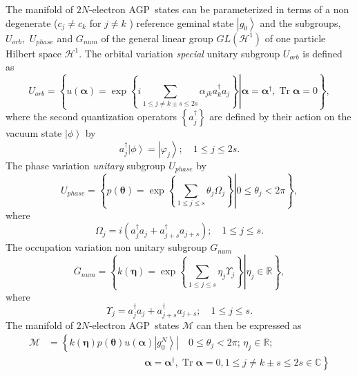 \documentclass[aps,preprint]{revtex4}%
\begin{document}
The manifold of $2N$-electron AGP\ states can be parameterized in terms of a
non degenerate ($c_{j}\neq c_{k}$ for $j\neq k$ ) reference geminal state
$\left\vert g_{0}\right\rangle $ and the subgroups, $U_{orb},$ $U_{phase}$ and
$G_{num}$ of the general linear group $GL\left(  \mathcal{H}^{1}\right)  $ of
one particle Hilbert space $\mathcal{H}^{1}$. The orbital variation
\emph{special} unitary subgroup $U_{orb}$ is defined as
\begin{equation}
U_{orb}=\left\{  \left.  u\left(  \mathbf{\alpha}\right)  =\exp\left\{
i\sum_{1\leq j\neq k\pm s\leq2s}\alpha_{jk}a_{k}^{\dagger}a_{j}\right\}
\right\vert \mathbf{\alpha}=\mathbf{\alpha}^{\dagger},\operatorname{Tr}%
\mathbf{\alpha}=0\right\}  ,\label{orb}%
\end{equation}
where the second quantization operators $\left\{  a_{j}^{\dagger}\right\}  $
are defined by their action on the vacuum state $\left\vert \phi\right\rangle
$ by
\begin{equation}
a_{j}^{\dagger}\left\vert \phi\right\rangle =\left\vert \varphi_{j}%
\right\rangle ;\quad1\leq j\leq2s.
\end{equation}
The phase variation \emph{unitary} subgroup $U_{phase}$ by%
\begin{equation}
U_{phase}=\left\{  \left.  p\left(  \mathbf{\theta}\right)  =\exp\left\{
\sum_{1\leq j\leq s}\theta_{j}\Omega_{j}\right\}  \right\vert 0\leq\theta
_{j}<2\pi\right\}  ,\label{phase}%
\end{equation}
where
\begin{equation}
\Omega_{j}=i\left(  a_{j}^{\dagger}a_{j}+a_{j+s}^{\dagger}a_{j+s}\right)
;\quad1\leq j\leq s.
\end{equation}
The occupation variation non unitary subgroup $G_{num}$
\begin{equation}
G_{num}=\left\{  \left.  k\left(  \mathbf{\eta}\right)  =\exp\left\{
\sum_{1\leq j\leq s}\eta_{j}\Upsilon_{j}\right\}  \right\vert \eta_{j}%
\in\mathbb{R}\right\}  ,\label{occup}%
\end{equation}
where
\begin{equation}
\Upsilon_{j}=a_{j}^{\dagger}a_{j}+a_{j+s}^{\dagger}a_{j+s};\quad1\leq j\leq s.
\end{equation}
The manifold of $2N$-electron AGP\ states $\mathcal{M}$ can then be expressed
as
\begin{align}
\mathcal{M}  & \mathcal{=}\left\{  \left.  k\left(  \mathbf{\eta}\right)
p\left(  \mathbf{\theta}\right)  u\left(  \mathbf{\alpha}\right)  \left\vert
g_{0}^{N}\right\rangle \right\vert \quad0\leq\theta_{j}<2\pi;\,\eta_{j}%
\in\mathbb{R};\right.  \nonumber\\
& \qquad\qquad\qquad\qquad\qquad\left.  \mathbf{\alpha}=\mathbf{\alpha
}^{\dagger},\operatorname{Tr}\mathbf{\alpha}=0,1\leq j\neq k\pm s\leq
2s\in\mathbb{C}\right\}
\end{align}
\end{document}
